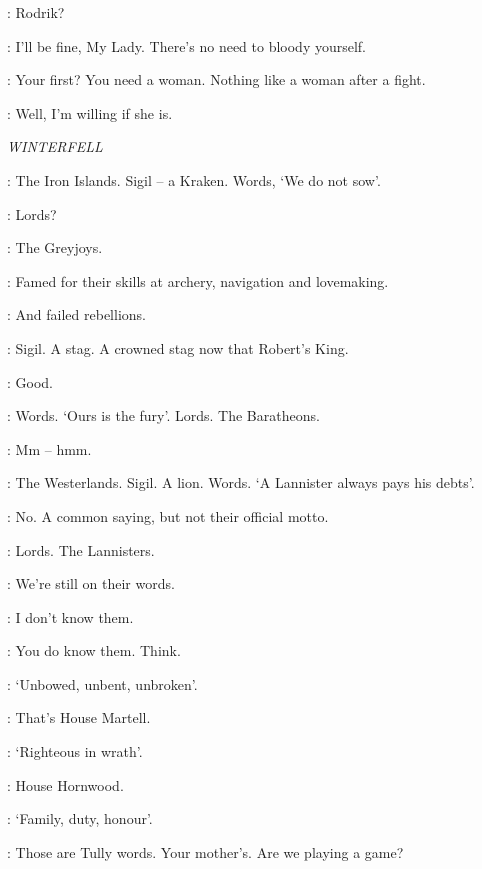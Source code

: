 \CATELYN: Rodrik? 

\RODRIK: I'll be fine, My Lady. There's no need to bloody yourself. 


\BRONN: Your first? You need a woman. Nothing like a woman after a fight. 

\TYRION:  Well, I'm willing if she is. 


\scene

\textit{WINTERFELL} 


\BRAN: The Iron Islands. Sigil -- a Kraken. Words, `We do not sow'. 

\LUWIN: Lords? 

\BRAN: The Greyjoys. 

\THEON: Famed for their skills at archery, navigation and lovemaking. 

\LUWIN: And failed rebellions. 


\BRAN: Sigil. A stag. A crowned stag now that Robert's King. 

\LUWIN: Good. 

\BRAN: Words. `Ours is the fury'. Lords. The Baratheons. 

\LUWIN: Mm -- hmm. 

\BRAN: The Westerlands. Sigil. A lion. Words. `A Lannister always pays his debts'. 

\LUWIN: No. A common saying, but not their official motto. 

\BRAN: Lords. The Lannisters. 

\LUWIN: We're still on their words. 

\BRAN: I don't know them. 

\LUWIN: You do know them. Think. 

\BRAN: `Unbowed, unbent, unbroken'. 

\LUWIN: That's House Martell. 

\BRAN: `Righteous in wrath'.

\LUWIN: House Hornwood. 

\BRAN: `Family, duty, honour'. 

\LUWIN: Those are Tully words. Your mother's. Are we playing a game? 

